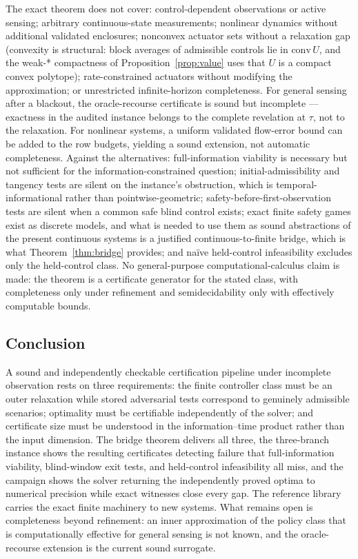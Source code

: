 \documentclass[10pt,twocolumn]{article}
\theoremstyle{plain}
\theoremstyle{definition}
\theoremstyle{remark}
\begin{document}
The exact theorem does not cover: control-dependent observations or active
sensing; arbitrary continuous-state measurements; nonlinear dynamics without
additional validated enclosures; nonconvex actuator sets without a relaxation gap (convexity is
structural: block averages of admissible controls lie in
\(\mathrm{conv}\,U\), and the weak-* compactness of
Proposition~\ref{prop:value} uses that \(U\) is a compact convex
polytope); rate-constrained actuators without modifying the
approximation; or unrestricted infinite-horizon completeness. For general
sensing after a blackout, the oracle-recourse certificate is sound but
incomplete --- exactness in the audited instance belongs to the complete
revelation at \(\tau\), not to the relaxation. For nonlinear systems, a uniform validated flow-error bound can
be added to the row budgets, yielding a sound extension, not automatic
completeness. Against the alternatives: full-information viability is necessary but not sufficient for the
information-constrained question; initial-admissibility and tangency tests
are silent on the instance's obstruction, which is temporal-informational
rather than pointwise-geometric; safety-before-first-observation tests are
silent when a common safe blind control exists; exact finite safety games
exist as discrete models, and what is needed to use them as sound
abstractions of the present continuous systems is a justified
continuous-to-finite bridge, which is what Theorem~\ref{thm:bridge}
provides; and na\"ive held-control infeasibility
excludes only the held-control class. No general-purpose
computational-calculus claim is made: the theorem is a certificate generator
for the stated class, with completeness only under refinement and
semidecidability only with effectively computable bounds.

\subsection{Conclusion}\label{conclusion}

A sound and independently checkable certification pipeline under
incomplete observation rests on three requirements: the finite controller
class must be an outer relaxation while stored adversarial tests correspond
to genuinely admissible scenarios; optimality must be certifiable
independently of the solver; and certificate size must be understood in
the information--time product rather than the input dimension. The bridge theorem delivers all three, the three-branch
instance shows the resulting certificates detecting failure that
full-information viability, blind-window exit tests, and held-control
infeasibility all miss, and the campaign shows the solver returning the independently proved optima
to numerical precision while exact witnesses close every gap.
The reference library carries the exact finite machinery to new systems.
What remains open is completeness beyond refinement: an inner
approximation of the policy class that is computationally effective for
general sensing is not known, and the oracle-recourse extension is the
current sound surrogate.
\end{document}
